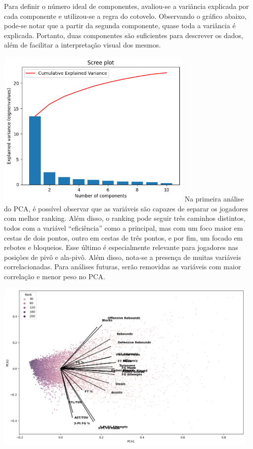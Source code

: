 \documentclass[
]{book}
\begin{document}
Para definir o número ideal de componentes, avaliou-se a variância explicada por cada componente e utilizou-se a regra do cotovelo.
Observando o gráfico abaixo, pode-se notar que a partir da segunda componente, quase toda a variância é explicada. Portanto, duas componentes são suficientes para descrever os dados, além de facilitar a interpretação visual dos mesmos.

\includegraphics[width=3.76042in,height=\textheight]{imagens/3.png}
Na primeira análise do PCA, é possível observar que as variáveis são capazes de separar os jogadores com melhor ranking. Além disso, o ranking pode seguir três caminhos distintos, todos com a variável ``eficiência'' como a principal, mas com um foco maior em cestas de dois pontos, outro em cestas de três pontos, e por fim, um focado em rebotes e bloqueios. Esse último é especialmente relevante para jogadores nas posições de pivô e ala-pivô.
Além disso, nota-se a presença de muitas variáveis correlacionadas. Para análises futuras, serão removidas as variáveis com maior correlação e menor peso no PCA.

\includegraphics[width=5.08333in,height=\textheight]{imagens/4.png}
\end{document}
